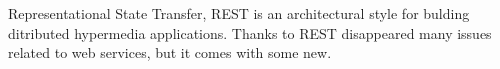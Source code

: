 Representational State Transfer, REST is an architectural style for bulding ditributed hypermedia applications.
Thanks to REST disappeared many issues related to web services, but it comes with some new.

    


